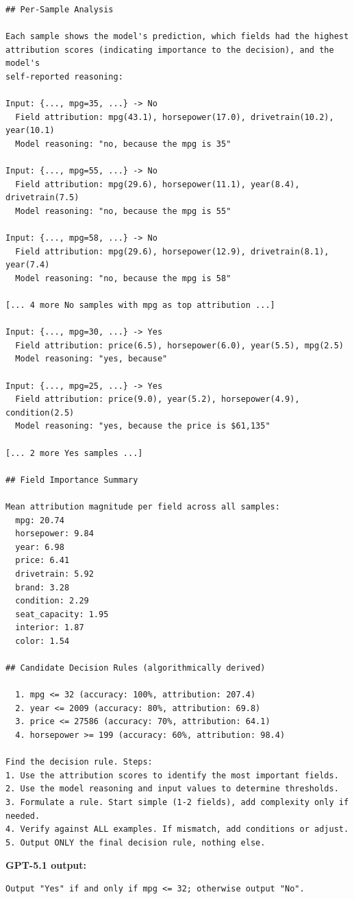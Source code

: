 \documentclass{article} %
\begin{document}
{\begin{verbatim}
## Per-Sample Analysis

Each sample shows the model's prediction, which fields had the highest
attribution scores (indicating importance to the decision), and the model's
self-reported reasoning:

Input: {..., mpg=35, ...} -> No
  Field attribution: mpg(43.1), horsepower(17.0), drivetrain(10.2), year(10.1)
  Model reasoning: "no, because the mpg is 35"

Input: {..., mpg=55, ...} -> No
  Field attribution: mpg(29.6), horsepower(11.1), year(8.4), drivetrain(7.5)
  Model reasoning: "no, because the mpg is 55"

Input: {..., mpg=58, ...} -> No
  Field attribution: mpg(29.6), horsepower(12.9), drivetrain(8.1), year(7.4)
  Model reasoning: "no, because the mpg is 58"

[... 4 more No samples with mpg as top attribution ...]

Input: {..., mpg=30, ...} -> Yes
  Field attribution: price(6.5), horsepower(6.0), year(5.5), mpg(2.5)
  Model reasoning: "yes, because"

Input: {..., mpg=25, ...} -> Yes
  Field attribution: price(9.0), year(5.2), horsepower(4.9), condition(2.5)
  Model reasoning: "yes, because the price is $61,135"

[... 2 more Yes samples ...]

## Field Importance Summary

Mean attribution magnitude per field across all samples:
  mpg: 20.74
  horsepower: 9.84
  year: 6.98
  price: 6.41
  drivetrain: 5.92
  brand: 3.28
  condition: 2.29
  seat_capacity: 1.95
  interior: 1.87
  color: 1.54

## Candidate Decision Rules (algorithmically derived)

  1. mpg <= 32 (accuracy: 100%, attribution: 207.4)
  2. year <= 2009 (accuracy: 80%, attribution: 69.8)
  3. price <= 27586 (accuracy: 70%, attribution: 64.1)
  4. horsepower >= 199 (accuracy: 60%, attribution: 98.4)

Find the decision rule. Steps:
1. Use the attribution scores to identify the most important fields.
2. Use the model reasoning and input values to determine thresholds.
3. Formulate a rule. Start simple (1-2 fields), add complexity only if needed.
4. Verify against ALL examples. If mismatch, add conditions or adjust.
5. Output ONLY the final decision rule, nothing else.
\end{verbatim}
}

\noindent\textbf{GPT-5.1 output:}
{\small
\begin{verbatim}
Output "Yes" if and only if mpg <= 32; otherwise output "No".
\end{verbatim}
}
\end{document}
